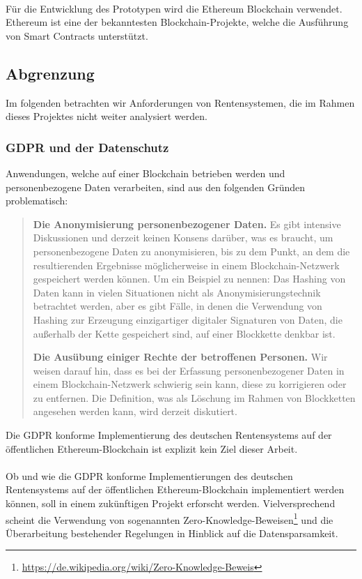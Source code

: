 \paragraph*{}
Für die Entwicklung des Prototypen wird die Ethereum Blockchain verwendet. Ethereum ist eine der bekanntesten Blockchain-Projekte, welche die Ausführung von Smart Contracts unterstützt.

\subsection{Abgrenzung}
Im folgenden betrachten wir Anforderungen von Rentensystemen, die im Rahmen dieses Projektes nicht weiter analysiert werden.

\subsubsection{GDPR und der Datenschutz}
Anwendungen, welche auf einer Blockchain betrieben werden und personenbezogene Daten verarbeiten, sind aus den folgenden Gründen problematisch:

\begin{quote}
\textbf{Die Anonymisierung personenbezogener Daten.} Es gibt intensive Diskussionen und derzeit keinen Konsens darüber, was es braucht, um personenbezogene Daten zu anonymisieren, bis zu dem Punkt, an dem die resultierenden Ergebnisse möglicherweise in einem Blockchain-Netzwerk gespeichert werden können. Um ein Beispiel zu nennen: Das Hashing von Daten kann in vielen Situationen nicht als Anonymisierungstechnik betrachtet werden, aber es gibt Fälle, in denen die Verwendung von Hashing zur Erzeugung einzigartiger digitaler Signaturen von Daten, die außerhalb der Kette gespeichert sind, auf einer Blockkette denkbar ist.

\textbf{Die Ausübung einiger Rechte der betroffenen Personen.} Wir weisen darauf hin, dass es bei der Erfassung personenbezogener Daten in einem Blockchain-Netzwerk schwierig sein kann, diese zu korrigieren oder zu entfernen. Die Definition, was als Löschung im Rahmen von Blockketten angesehen werden kann, wird derzeit diskutiert.\cite{gdpr}
\end{quote}

Die GDPR konforme Implementierung des deutschen Rentensystems auf der öffentlichen Ethereum-Blockchain ist explizit kein Ziel dieser Arbeit.

\paragraph*{}
Ob und wie die GDPR konforme Implementierungen des deutschen Rentensystems auf der öffentlichen Ethereum-Blockchain implementiert werden können, soll in einem zukünftigen Projekt erforscht werden. Vielversprechend scheint die Verwendung von sogenannten Zero-Knowledge-Beweisen\footnote{\url{https://de.wikipedia.org/wiki/Zero-Knowledge-Beweis}} und die Überarbeitung bestehender Regelungen in Hinblick auf die Datensparsamkeit.

